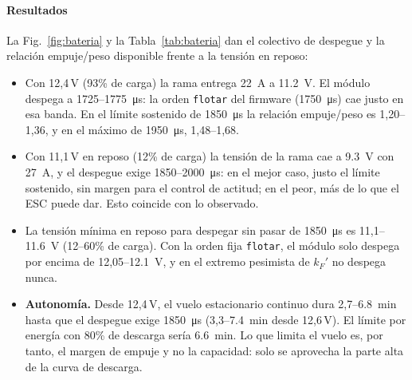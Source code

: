 \paragraph{Resultados}
La Fig.~\ref{fig:bateria} y la Tabla~\ref{tab:bateria} dan el colectivo de despegue y la relación empuje/peso disponible frente a la tensión en reposo:
\begin{itemize}
  \item Con 12,4\,V (93\% de carga) la rama entrega \SI{22}{\ampere} a \SI{11.2}{\volt}. El módulo despega a 1725--\SI{1775}{\micro\second}: la orden \texttt{flotar} del firmware (\SI{1750}{\micro\second}) cae justo en esa banda. En el límite sostenido de \SI{1850}{\micro\second} la relación empuje/peso es 1,20--1,36, y en el máximo de \SI{1950}{\micro\second}, 1,48--1,68.
  \item Con 11,1\,V en reposo (12\% de carga) la tensión de la rama cae a \SI{9.3}{\volt} con \SI{27}{\ampere}, y el despegue exige 1850--\SI{2000}{\micro\second}: en el mejor caso, justo el límite sostenido, sin margen para el control de actitud; en el peor, más de lo que el ESC puede dar. Esto coincide con lo observado.
  \item La tensión mínima en reposo para despegar sin pasar de \SI{1850}{\micro\second} es 11,1--\SI{11.6}{\volt} (12--60\% de carga). Con la orden fija \texttt{flotar}, el módulo solo despega por encima de 12,05--\SI{12.1}{\volt}, y en el extremo pesimista de $k_F'$ no despega nunca.
  \item \textbf{Autonomía.} Desde 12,4\,V, el vuelo estacionario continuo dura 2,7--\SI{6.8}{\minute} hasta que el despegue exige \SI{1850}{\micro\second} (3,3--\SI{7.4}{\minute} desde 12,6\,V). El límite por energía con 80\% de descarga sería \SI{6.6}{\minute}. Lo que limita el vuelo es, por tanto, el margen de empuje y no la capacidad: solo se aprovecha la parte alta de la curva de descarga.
\end{itemize}

